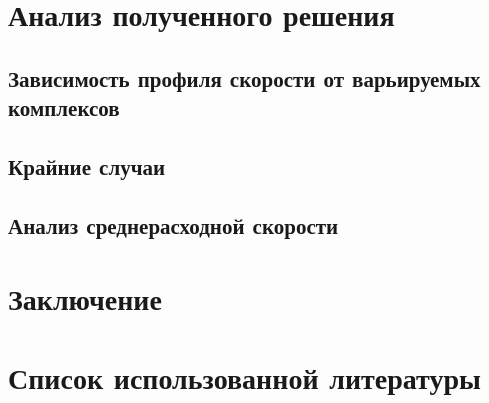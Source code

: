 \documentclass[12pt]{article}
\begin{document}
\section{Анализ полученного решения}
\subsection{Зависимость профиля скорости от варьируемых комплексов}
\subsection{Крайние случаи}
\subsection{Анализ среднерасходной скорости}
\newpage
\section{Заключение}
\section{Список использованной литературы}
%
%
\end{document}
